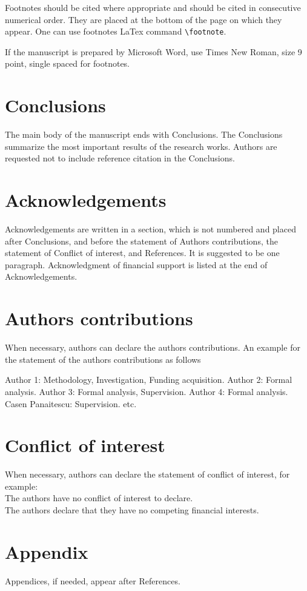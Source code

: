 \documentclass[a4,11pt]{cip-v3-cls-submit}
\begin{document}
Footnotes should be cited where appropriate and
should be cited in consecutive numerical order. They are placed at the bottom of the page on
which they appear. One can use footnotes LaTex command \verb|\footnote|.

If the manuscript is prepared by Microsoft Word, use Times New Roman, size 9 point, single spaced for footnotes.


\section{Conclusions}

The main body of the manuscript ends with Conclusions. The Conclusions summarize the most important results of the research works. Authors are requested not to include reference citation in the Conclusions.


\section*{Acknowledgements}
Acknowledgements are written in a section, which is not numbered and placed after Conclusions, and before the statement of Authors contributions, the statement of Conflict of interest, and References. It is suggested to be one paragraph. Acknowledgment of financial support is listed at the end of Acknowledgements.

\section*{Authors contributions}
When necessary, authors can declare the authors contributions. An example for the statement of the authors contributions as follows

Author 1: Methodology, Investigation, Funding acquisition. Author 2: Formal analysis. Author 3: Formal analysis, Supervision. Author 4: Formal analysis. Casen Panaitescu: Supervision. etc.

\section*{Conflict of interest}
When necessary, authors can declare the statement of conflict of interest, for example:\\
The authors have no conflict of interest to declare.\\
The authors declare that they have no competing financial interests.






\section*{Appendix}

Appendices, if needed, appear after References.
\end{document}

